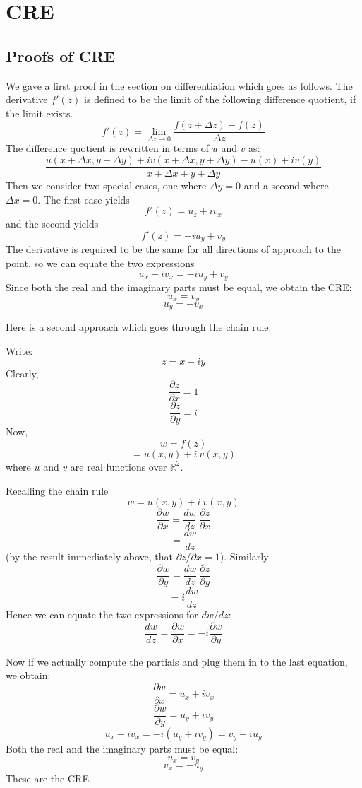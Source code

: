 \documentclass[11pt, oneside]{article}   	%
\begin{document}
\section{CRE}
\subsection*{Proofs of CRE}
We gave a first proof in the section on differentiation which goes as follows.  The derivative $f'(z)$ is defined to be the limit of the following difference quotient, if the limit exists.
\[ f'(z) = \lim_{\Delta z \rightarrow 0} \frac{f(z + \Delta z) - f(z)}{\Delta z} \]
The difference quotient is rewritten in terms of $u$ and $v$ as:
\[ \frac{u(x + \Delta x, y + \Delta y) + i v(x + \Delta x, y + \Delta y) - u(x) + i v(y)}{x + \Delta x + y + \Delta y} \]
Then we consider two special cases, one where $\Delta y = 0$ and a second where $\Delta x = 0$.  The first case yields
\[ f'(z) = u_z + i v_x \]
and the second yields
\[ f'(z) = -i u_y + v_y \]
The derivative is required to be the same for all directions of approach to the point, so we can equate the two expressions
\[ u_x + i v_x = -i u_y + v_y \]
Since both the real and the imaginary parts must be equal, we obtain the CRE:
\[ u_x = v_y \]
\[ u_y = - v_x \]

Here is a second approach which goes through the chain rule.

Write:
\[ z = x + iy \]
Clearly,
\[ \frac{\partial z}{\partial x} = 1 \]
\[ \frac{\partial z}{\partial y} = i \]
Now,
\[ w = f(z) \]
\[ = u(x,y) + i \ v(x,y) \]
where $u$ and $v$ are real functions over $\mathbb{R}^2$.

Recalling the chain rule
\[ w = u(x,y) + i \ v(x,y) \]
\[ \frac{\partial w}{\partial x} = \frac{dw}{dz} \ \frac{\partial z}{\partial x} \]
\[ =  \frac{dw}{dz} \]
(by the result immediately above, that $\partial z/\partial x = 1$).
Similarly
\[ \frac{\partial w}{\partial y} = \frac{dw}{dz} \ \frac{\partial z}{\partial y} \]
\[ =  i \frac{dw}{dz} \]
Hence we can equate the two expressions for $dw/dz$:
\[ \frac{dw}{dz} = \frac{\partial w}{\partial x} = -i \frac{\partial w}{\partial y} \]

Now if we actually compute the partials and plug them in to the last equation, we obtain:
\[ \frac{\partial w}{\partial x} = u_x + i v_x \]
\[ \frac{\partial w}{\partial y} = u_y + i v_y \]
\[ u_x + i v_x = -i (u_y + i v_y) = v_y - i u_y \]
Both the real and the imaginary parts must be equal:
\[ u_x = v_y \]
\[ v_x = - u_y \]
These are the CRE.
\end{document}
